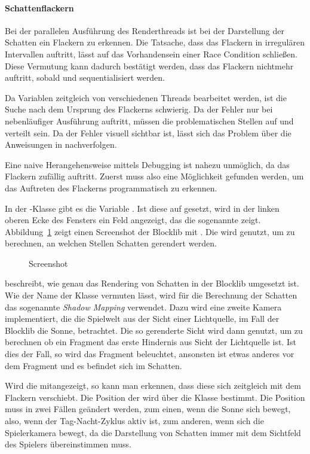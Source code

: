 \paragraph{Schattenflackern}
Bei der parallelen Ausführung des Renderthreads ist bei der Darstellung der Schatten ein Flackern zu erkennen. Die Tatsache, dass das Flackern in irregulären Intervallen auftritt, lässt auf das Vorhandensein einer Race Condition schließen. Diese Vermutung kann dadurch bestätigt werden, dass das Flackern nichtmehr auftritt, sobald  und  sequentialisiert werden.

Da Variablen zeitgleich von verschiedenen Threads bearbeitet werden, ist die Suche nach dem Ursprung des Flackerns schwierig. Da der Fehler nur bei nebenläufiger Ausführung auftritt, müssen die problematischen Stellen auf  und  verteilt sein. Da der Fehler visuell sichtbar ist, lässt sich das Problem über die Anweisungen in  nachverfolgen. 

Eine naive Herangehensweise mittels Debugging ist nahezu unmöglich, da das Flackern zufällig auftritt. Zuerst muss also eine Möglichkeit gefunden werden, um das Auftreten des Flackerns programmatisch zu erkennen.

In der -Klasse gibt es die Variable . Ist diese auf  gesetzt, wird in der linken oberen Ecke des Fensters ein Feld angezeigt, das die sogenannte  zeigt. Abbildung~\ref{fig:ShadowMap} zeigt einen Screenshot der Blocklib mit . Die  wird genutzt, um zu berechnen, an welchen Stellen Schatten gerendert werden.
\begin{figure}
	\caption{Screenshot}\label{fig:ShadowMap}
\end{figure}
\textcite{Ebbinger2018} beschreibt, wie genau das Rendering von Schatten in der Blocklib umgesetzt ist. Wie der Name der Klasse  vermuten lässt, wird für die Berechnung der Schatten das sogenannte \emph{Shadow Mapping} verwendet. Dazu wird eine zweite Kamera implementiert, die die Spielwelt aus der Sicht einer Lichtquelle, im Fall der Blocklib die Sonne, betrachtet. Die so gerenderte Sicht wird dann genutzt, um zu berechnen ob ein Fragment das erste Hindernis aus Sicht der Lichtquelle ist. Ist dies der Fall, so wird das Fragment beleuchtet, ansonsten ist etwas anderes vor dem Fragment und es befindet sich im Schatten.

Wird die  mitangezeigt, so kann man erkennen, dass diese sich zeitgleich mit dem Flackern verschiebt. Die Position der  wird über die Klasse  bestimmt. Die Position muss in zwei Fällen geändert werden, zum einen, wenn die Sonne sich bewegt, also, wenn der Tag-Nacht-Zyklus aktiv ist, zum anderen, wenn sich die Spielerkamera bewegt, da die Darstellung von Schatten immer mit dem Sichtfeld des Spielers übereinstimmen muss.

